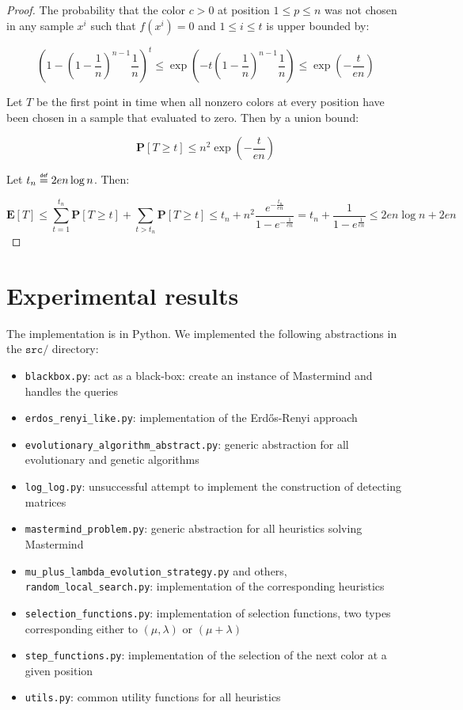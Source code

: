 \documentclass[12pt]{article}
\theoremstyle{definition}
\theoremstyle{plain}
\theoremstyle{remark}
\newcommand\mydef{\mathrel{\overset{\makebox[0pt]{\mbox{\normalfont\tiny\sffamily def}}}{=}}}
\begin{document}
\begin{proof}
    The probability that the color $c>0$ at position $1\le p\le n$
    was not chosen in any sample $x^i$ such that $f(x^i)=0$ and $1\le i\le t$
    is upper bounded by:

    $$\left(1-\left(1-\frac{1}{n}\right)^{n-1}\frac{1}{n}\right)^t\le \exp\left(-t\left(1-\frac{1}{n}\right)^{n-1}\frac{1}{n}\right)\le\exp\left(-\frac{t}{en}\right)$$

    Let $T$ be the first point in time when all nonzero colors at every position have
    been chosen in a sample that evaluated to zero. Then by a union bound:

    $$\mathbf{P}[T\ge t]\le n^2 \exp\left(-\frac{t}{en}\right)$$

    Let $t_n\mydef 2en\log n$. Then:

    $$\mathbf{E}[T]\le \sum_{t=1}^{t_n} \mathbf{P}[T\ge t] +\sum_{t>t_n} \mathbf{P}[T\ge t]
    \le t_n+n^2 \frac{e^{-\frac{t_n}{en}}}{1-e^{-\frac{1}{en}}}= t_n+\frac{1}{1-e^{\frac{1}{en}}}\le 2en\log n+2en$$\qedhere

\end{proof}

\section{Experimental results}

The implementation is in Python. We implemented the following abstractions in the $\texttt{src/}$ directory:

\begin{itemize}
    \item \texttt{blackbox.py}: act as a black-box: create an instance of Mastermind and handles the queries
    \item \texttt{erdos\_renyi\_like.py}: implementation of the Erd\H{o}s-Renyi approach
    \item \texttt{evolutionary\_algorithm\_abstract.py}: generic abstraction for all evolutionary and genetic algorithms
    \item \texttt{log\_log.py}: unsuccessful attempt to implement the construction of detecting matrices
    \item \texttt{mastermind\_problem.py}: generic abstraction for all heuristics solving Mastermind
    \item \texttt{mu\_plus\_lambda\_evolution\_strategy.py} and others, \texttt{random\_local\_search.py}: implementation of the corresponding heuristics
    \item \texttt{selection\_functions.py}: implementation of selection functions, two types corresponding either to $(\mu,\lambda)$ or $(\mu+\lambda)$
    \item \texttt{step\_functions.py}: implementation of the selection of the next color at a given position
    \item \texttt{utils.py}: common utility functions for all heuristics
\end{itemize}
\end{document}
